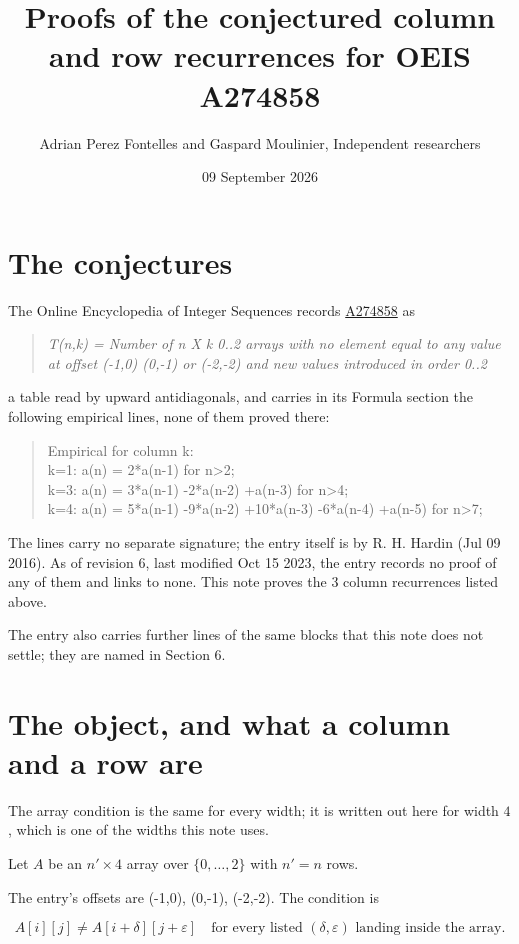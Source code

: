 \documentclass[11pt]{article}
\title{Proofs of the conjectured column and row recurrences for OEIS A274858}
\author{Adrian Perez Fontelles and Gaspard Moulinier, Independent researchers}
\date{09 September 2026}
\theoremstyle{definition}
\begin{document}
\maketitle
\section{The conjectures}

The Online Encyclopedia of Integer Sequences records \href{https://oeis.org/A274858}{A274858} as

\begin{quote}\itshape T(n,k) = Number of n X k 0..2 arrays with no element equal to any value at offset (-1,0) (0,-1) or (-2,-2) and new values introduced in order 0..2\end{quote}

a table read by upward antidiagonals, and carries in its Formula section the following empirical lines, none of them proved there:

\begin{quote}\ttfamily Empirical for column k:\\
k=1: a(n) = 2*a(n-1) for n>2;\\k=3: a(n) = 3*a(n-1) -2*a(n-2) +a(n-3) for n>4;\\k=4: a(n) = 5*a(n-1) -9*a(n-2) +10*a(n-3) -6*a(n-4) +a(n-5) for n>7;\end{quote}

The lines carry no separate signature; the entry itself is by R. H. Hardin (Jul 09 2016). As of revision 6, last modified Oct 15 2023, the entry records no proof of any of them and links to none. This note proves the 3 column recurrences listed above.

The entry also carries further lines of the same blocks that this note does not settle; they are named in Section 6.

\section{The object, and what a column and a row are}

The array condition is the same for every width; it is written out here for width $4$, which is one of the widths this note uses.

Let $A$ be an $n' \times 4$ array over $\{0,\dots,2\}$ with $n' = n$ rows.

The entry's offsets are (-1,0), (0,-1), (-2,-2). The condition is

\[A[i][j] \ne A[i{+}\delta][j{+}\varepsilon]\quad\text{for every listed }(\delta,\varepsilon)\text{ landing inside the array.}\]
\end{document}
